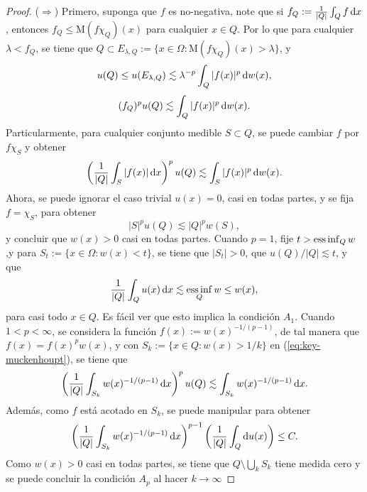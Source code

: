 \begin{proof}
	($\Rightarrow$) Primero, suponga que $f$ es no-negativa, note que si $f_Q := \frac{1}{|Q|} \int_Q f\mathop{}\!\mathrm{d} x$, entonces $f_Q\leq \mathrm{M}(f\chi_Q)(x)$ para cualquier $x\in Q$. Por lo que para cualquier $\lambda < f_Q$, se tiene que $Q\subset E_{\lambda, Q} := \{x\in\Omega: \mathrm{M}(f\chi_Q)(x)>\lambda\}$, y 
	\begin{equation*}
		u(Q) \leq u(E_{\lambda,Q}) \lesssim \lambda^{-p} \int_Q |f(x)|^p\mathop{}\!\mathrm{d} w(x),
	\end{equation*}
	\begin{equation*}
		(f_Q)^pu(Q) \lesssim \int_Q |f(x)|^p\mathop{}\!\mathrm{d} w(x).
	\end{equation*}
	Particularmente, para cualquier conjunto medible $S\subset Q$, se puede cambiar $f$ por $f\chi_S$ y obtener 
	\begin{equation}\label{eq:key-muckenhoupt}
		\left(\frac{1}{|Q|}\int_S |f(x)|\mathop{}\!\mathrm{d} x \right)^p u(Q) \lesssim \int_S |f(x)|^p\mathop{}\!\mathrm{d} w(x).
	\end{equation}
	Ahora, se puede ignorar el caso trivial $u(x) = 0$, casi en todas partes, y se fija $f=\chi_S$, para obtener 
	\begin{equation*}
		|S|^p u(Q) \lesssim|Q|^p w(S),
	\end{equation*}
	y concluir que $w(x)>0$ casi en todas partes. Cuando $p=1$, fije $t > \operatorname*{ess\,inf}_Q w$ ,y para $S_t := \{x\in\Omega: w(x)<t\}$, se tiene que $|S_t|>0$, que $u(Q)/|Q| \lesssim t$, y que 
	\begin{equation*}
		\frac{1}{|Q|}\int_Q u(x)\mathop{}\!\mathrm{d} x \lesssim \operatorname*{ess\,inf}_Q w \leq w(x),
	\end{equation*}
	para casi todo $x\in Q$. Es fácil ver que esto implica la condición $A_1$. Cuando $1<p<\infty$, se considera la función $f(x) := w(x)^{-1/(p-1)}$, de tal manera que $f(x) = f(x)^pw(x)$, y con $S_k:=\{x\in Q: w(x) > 1/k\}$ en (\ref{eq:key-muckenhoupt}), se  tiene que 
	\begin{equation*}
		\left(\frac{1}{|Q|}\int_{S_k} w(x)^{-1/(p-1)}\mathop{}\!\mathrm{d} x \right)^p u(Q) \lesssim \int_{S_k} w(x)^{-1/(p-1)}\mathop{}\!\mathrm{d} x.
	\end{equation*}
	Además, como $f$ está acotado en $S_k$, se puede manipular para obtener
	\begin{equation*}
		\left(\frac{1}{|Q|}\int_{S_k} w(x)^{-1/(p-1)}\mathop{}\!\mathrm{d} x \right)^{p-1} \left(\frac{1}{|Q|}\int_Q\mathop{}\!\mathrm{d} u(x)\right) \leq C.
	\end{equation*}
	Como $w(x)>0$ casi en todas partes, se tiene que $Q\setminus\bigcup_kS_k$ tiene medida cero y se puede concluir la condición $A_p$ al hacer $k\to\infty$

\end{proof}
